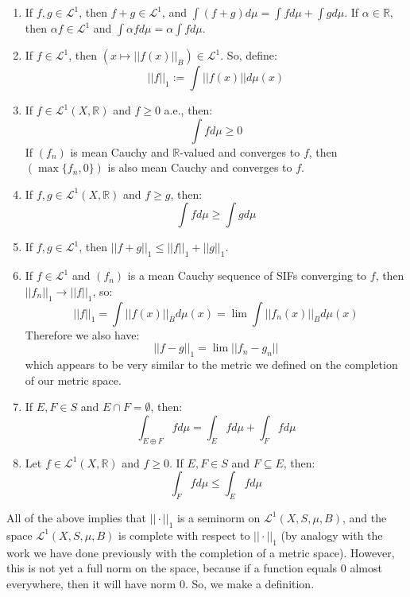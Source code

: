 \documentclass[11pt, oneside]{amsart}   	%
\theoremstyle{definition}
\begin{document}
	\begin{enumerate}
		\item If $f, g\in\mathcal L^1$, then $f + g\in\mathcal L^1$, and $\int(f + g)d\mu = \int fd\mu + \int gd\mu$. If $\alpha
		\in\mathbb R$, then $\alpha f\in\mathcal L^1$ and $\int\alpha fd\mu = \alpha\int fd\mu$. 
		
		\item If $f\in\mathcal L^1$, then $(x\mapsto ||f(x)||_B)\in\mathcal L^1$. So, define:
		$$
			||f||_1 := \int ||f(x)||d\mu(x)
		$$
		
		\item If $f\in\mathcal L^1(X, \mathbb R)$ and $f\geq 0$ a.e., then:
		$$
			\int fd\mu\geq 0
		$$
		If $(f_n)$ is mean Cauchy and $\mathbb R$-valued and converges to $f$, then $(\max\{f_n, 0\})$ is also mean 
		Cauchy and converges to $f$.
		
		\item If $f, g\in\mathcal L^1(X, \mathbb R)$ and $f\geq g$, then:
		$$
			\int fd\mu\geq\int gd\mu
		$$
		
		\item If $f, g\in\mathcal L^1$, then $||f + g||_1\leq ||f||_1 + ||g||_1$.
		
		\item If $f\in\mathcal L^1$ and $(f_n)$ is a mean Cauchy sequence of SIFs converging to $f$, then 
		$||f_n||_1\rightarrow ||f||_1$, so:
		$$
			||f||_1 = \int ||f(x)||_Bd\mu(x) = \lim\int ||f_n(x)||_Bd\mu(x)
		$$
		Therefore we also have:
		$$
			||f - g||_1 = \lim||f_n - g_n||
		$$
		which appears to be very similar to the metric we defined on the completion of our metric space. 
		
		\item If $E, F\in S$ and $E\cap F = \emptyset$, then:
		$$
			\int_{E\oplus F} fd\mu = \int_E fd\mu + \int_F fd\mu
		$$
		
		\item Let $f\in\mathcal L^1(X, \mathbb R)$ and $f\geq 0$. If $E, F\in S$ and $F\subseteq E$, then:
		$$
			\int_F fd\mu\leq\int_E fd\mu
		$$
	\end{enumerate}
	
	All of the above implies that $||\cdot||_1$ is a seminorm on $\mathcal L^1(X, S, \mu, B)$, and the space 
	$\mathcal L^1(X, S, \mu, B)$ is complete with respect to $||\cdot||_1$ (by analogy with the work we have done previously 
	with the completion of a metric space). However, this is not yet a full norm on the space, because if a function equals 0 
	almost everywhere, then it will have norm 0. So, we make a definition.
	
\end{document}
